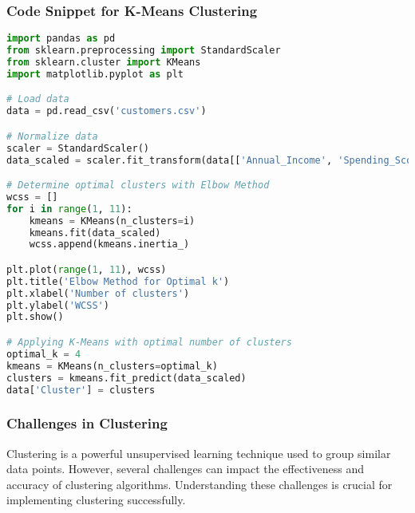 \documentclass[aspectratio=169]{beamer}
\begin{document}
\begin{frame}[fragile]
  \frametitle{Code Snippet for K-Means Clustering}
  
  \begin{lstlisting}[language=Python]
import pandas as pd
from sklearn.preprocessing import StandardScaler
from sklearn.cluster import KMeans
import matplotlib.pyplot as plt

# Load data
data = pd.read_csv('customers.csv')

# Normalize data
scaler = StandardScaler()
data_scaled = scaler.fit_transform(data[['Annual_Income', 'Spending_Score', 'Age']])

# Determine optimal clusters with Elbow Method
wcss = []
for i in range(1, 11):
    kmeans = KMeans(n_clusters=i)
    kmeans.fit(data_scaled)
    wcss.append(kmeans.inertia_)

plt.plot(range(1, 11), wcss)
plt.title('Elbow Method for Optimal k')
plt.xlabel('Number of clusters')
plt.ylabel('WCSS')
plt.show()

# Applying K-Means with optimal number of clusters
optimal_k = 4
kmeans = KMeans(n_clusters=optimal_k)
clusters = kmeans.fit_predict(data_scaled)
data['Cluster'] = clusters
  \end{lstlisting}
\end{frame}

\begin{frame}[fragile]
  \frametitle{Challenges in Clustering}
  Clustering is a powerful unsupervised learning technique used to group similar data points. However, several challenges can impact the effectiveness and accuracy of clustering algorithms. Understanding these challenges is crucial for implementing clustering successfully.
\end{frame}
\end{document}
